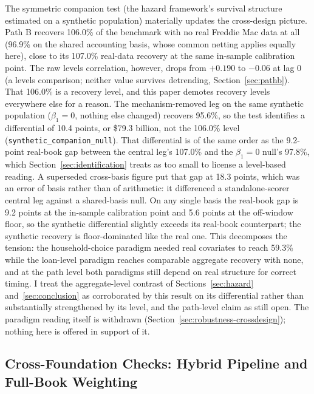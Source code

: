 \documentclass[12pt]{article}
\begin{document}
The symmetric companion test (the hazard framework's survival structure estimated on a synthetic population) materially updates the cross-design picture. Path B recovers 106.0\% of the benchmark with no real Freddie Mac data at all (96.9\% on the shared accounting basis, whose common netting applies equally here), close to its 107.0\% real-data recovery at the same in-sample calibration point. The raw levels correlation, however, drops from $+0.190$ to $-0.06$ at lag 0 (a levels comparison; neither value survives detrending, Section~\ref{sec:pathb}). That 106.0\% is a recovery level, and this paper demotes recovery levels everywhere else for a reason. The mechanism-removed leg on the same synthetic population ($\beta_1 = 0$, nothing else changed) recovers 95.6\%, so the test identifies a differential of 10.4 points, or \$79.3 billion, not the 106.0\% level (\texttt{synthetic\_companion\_null}). That differential is of the same order as the 9.2-point real-book gap between the central leg's 107.0\% and the $\beta_1 = 0$ null's 97.8\%, which Section~\ref{sec:identification} treats as too small to license a level-based reading. A superseded cross-basis figure put that gap at 18.3 points, which was an error of basis rather than of arithmetic: it differenced a standalone-scorer central leg against a shared-basis null. On any single basis the real-book gap is 9.2 points at the in-sample calibration point and 5.6 points at the off-window floor, so the synthetic differential slightly exceeds its real-book counterpart; the synthetic recovery is floor-dominated like the real one. This decomposes the tension: the household-choice paradigm needed real covariates to reach 59.3\% while the loan-level paradigm reaches comparable aggregate recovery with none, and at the path level both paradigms still depend on real structure for correct timing. I treat the aggregate-level contrast of Sections~\ref{sec:hazard} and~\ref{sec:conclusion} as corroborated by this result on its differential rather than substantially strengthened by its level, and the path-level claim as still open. The paradigm reading itself is withdrawn (Section~\ref{sec:robustness-crossdesign}); nothing here is offered in support of it.

\subsection{Cross-Foundation Checks: Hybrid Pipeline and Full-Book Weighting}\label{sec:robustness-hybrid}
\end{document}
